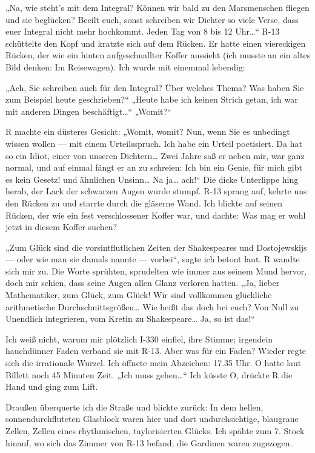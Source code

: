 „Na, wie steht's mit dem Integral? Können wir bald zu den
Marsmenschen fliegen und sie beglücken? Beeilt euch, sonst
schreiben wir Dichter so viele Verse, dass euer Integral nicht mehr
hochkommt. Jeden Tag von 8 bis 12 Uhr\ldots{}“ R-13 schüttelte den Kopf
und kratzte sich auf dem Rücken. Er hatte einen viereckigen Rücken,
der wie ein hinten aufgeschnallter Koffer aussieht (ich musste an
ein altes Bild denken: Im Reisewagen). Ich wurde mit einemmal
lebendig:

„Ach, Sie schreiben auch für den Integral? Über welches Thema? Was
haben Sie zum Beispiel heute geschrieben?“ „Heute habe ich keinen
Strich getan, ich war mit anderen Dingen beschäftigt\ldots{}“ „Womit?“

R machte ein düsteres Gesicht: „Womit, womit? Nun, wenn Sie es
unbedingt wissen wollen — mit einem Urteilsspruch. Ich habe ein
Urteil poetisiert. Da hat so ein Idiot, einer von unseren
Dichtern\ldots{} Zwei Jahre saß er neben mir, war ganz normal, und auf
einmal fängt er an zu schreien: \glq{}Ich bin ein Genie,
für mich gibt es kein Gesetz!\grq{} und ähnlichen Unsinn\ldots{} Na
ja\ldots{} ach!“ Die dicke Unterlippe hing herab, der Lack der schwarzen
Augen wurde stumpf. R-13 sprang auf, kehrte uns den Rücken zu und
starrte durch die gläserne Wand. Ich blickte auf seinen Rücken, der
wie ein fest verschlossener Koffer war, und dachte: Was mag er wohl
jetzt in diesem Koffer suchen?

„Zum Glück sind die vorsintflutlichen Zeiten der Shakespeares und
Dostojewskijs — oder wie man sie damals nannte — vorbei“, sagte ich
betont laut. R wandte sich mir zu. Die Worte sprühten, sprudelten
wie immer aus seinem Mund hervor, doch mir schien, dass seine Augen
allen Glanz verloren hatten. „Ja, lieber Mathematiker, zum Glück,
zum Glück! Wir sind vollkommen glückliche arithmetische
Durchschnittsgrößen\ldots{} Wie heißt das doch bei euch? Von Null zu
Unendlich integrieren, vom Kretin zu Shakespeare\ldots{} Ja, so ist
das!“

Ich weiß nicht, warum mir plötzlich I-330 einfiel, ihre Stimme;
irgendein hauchdünner Faden verband sie mit R-13. Aber was für ein
Faden? Wieder regte sich die irrationale Wurzel. Ich öffnete mein
Abzeichen: 17.35 Uhr. O hatte laut Billett noch 45 Minuten Zeit.
„Ich muss gehen\ldots{}“ Ich küsste O, drückte R die Hand und ging zum
Lift.

Draußen überquerte ich die Straße und blickte zurück: In dem
hellen, sonnendurchfluteten Glasblock waren hier und dort
undurchsichtige, blaugraue Zellen, Zellen eines rhythmischen,
taylorisierten Glücks. Ich spähte zum 7. Stock hinauf, wo sich das
Zimmer von R-13 befand; die Gardinen waren zugezogen.

